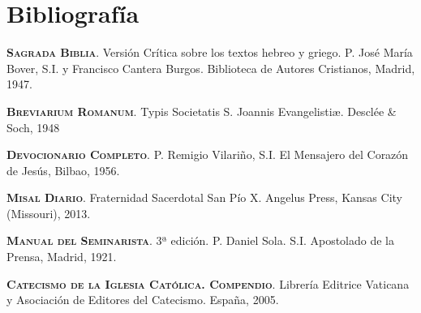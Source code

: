 \documentclass[10pt,twoside]{book}
\begin{document}

\chapter*{Bibliografía}

\setlength{\parindent}{0ex}
\textsc{\textbf{Sagrada Biblia}}. Versión Crítica sobre los textos hebreo y griego. P. José María Bover, S.I. y Francisco Cantera Burgos. Biblioteca de Autores Cristianos, Madrid, 1947.

\textsc{\textbf{Breviarium Romanum}}. Typis Societatis S. Joannis Evangelisti\ae. Desclée \& Soch, 1948

\textsc{\textbf{Devocionario Completo}}. P. Remigio Vilariño, S.I. El Mensajero del Corazón de Jesús, Bilbao, 1956.

\textsc{\textbf{Misal Diario}}. Fraternidad Sacerdotal San Pío X. Angelus Press, Kansas City (Missouri), 2013.

\textsc{\textbf{Manual del Seminarista}}. 3ª edición. P. Daniel Sola. S.I. Apostolado de la Prensa, Madrid, 1921.

\textsc{\textbf{Catecismo de la Iglesia Católica. Compendio}}. Librería Editrice Vaticana y Asociación de Editores del Catecismo. España, 2005.
\end{document}
